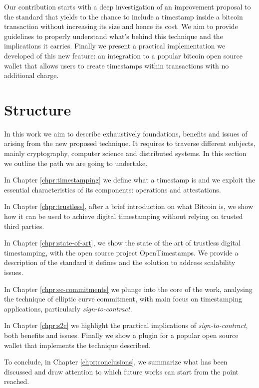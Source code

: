 Our contribution starts with a deep investigation of an improvement proposal \cite{PoePR, PoeIs} to the standard that yields to the chance to include a timestamp inside a bitcoin transaction without increasing its size and hence its cost. 
We aim to provide guidelines to properly understand what's behind this technique and the implications it carries.
Finally we present a practical implementation we developed of this new feature: an integration to a popular bitcoin open source wallet that allows users to create timestamps within transactions with no additional charge. 

\section{Structure}
In this work we aim to describe exhaustively foundations, benefits and issues of arising from the new proposed technique. 
It requires to traverse different subjects, mainly cryptography, computer science and distributed systems.
In this section we outline the path we are going to undertake.

In Chapter \ref{chpr:timestamping} we define what a timestamp is and we exploit the essential characteristics of its components: operations and attestations.

In Chapter \ref{chpr:trustless}, after a brief introduction on what Bitcoin is, we show how it can be used to achieve digital timestamping without relying on trusted third parties.

In Chapter \ref{chpr:state-of-art}, we show the state of the art of trustless digital timestamping, with the open source project OpenTimestamps. 
We provide a description of the standard it defines and the solution to address scalability issues.

In Chapter \ref{chpr:ec-commitments} we plunge into the core of the work, analysing the technique of elliptic curve commitment, with main focus on timestamping applications, particularly \textit{sign-to-contract}.

In Chapter \ref{chpr:s2c} we highlight the practical implications of \textit{sign-to-contract}, both benefits and issues. Finally we show a plugin for a popular open source wallet that implements the technique described.

To conclude, in Chapter \ref{chpr:conclusions}, we summarize what has been discussed and draw attention to which future works can start from the point reached.